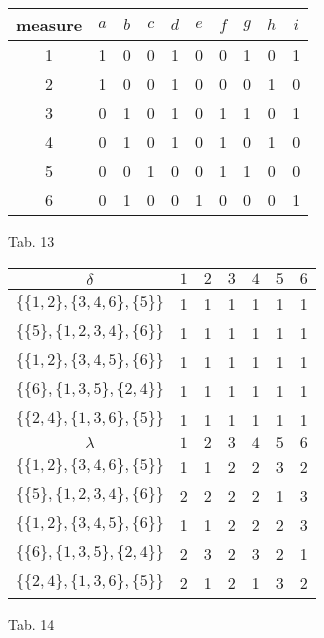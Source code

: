 \vspace{1cm}
{\rm
\begin{center}
\begin{tabular}{|c|c|c|c|c|c|c|c|c|c|}\hline%
measure & $a$ & $b$ & $c$ & $d$ & $e$ & $f$ & $g$ & $h$ & $i$ \\ \hline
1     &  1  &  0  &  0  &  1  &  0  &  0  &  1  &  0  &  1  \\
2     &  1  &  0  &  0  &  1  &  0  &  0  &  0  &  1  &  0  \\
3     &  0  &  1  &  0  &  1  &  0  &  1  &  1  &  0  &  1  \\
4     &  0  &  1  &  0  &  1  &  0  &  1  &  0  &  1  &  0  \\
5     &  0  &  0  &  1  &  0  &  0  &  1  &  1  &  0  &  0  \\
6     &  0  &  1  &  0  &  0  &  1  &  0  &  0  &  0  &  1  \\
\hline
\end{tabular}

\begin{center} Tab. 13  \end{center}
\end{center}
}

\vspace{1cm}
{\rm
\begin{center}
\begin{tabular}{|c|c|c|c|c|c|c|}\hline%
$\delta$ & $1$ & $2$ & $3$ & $4$ & $5$ & $6$ \\ \hline
$\{\{1,2\},\{3,4,6\},\{5\}\}$  &1&1&1&1&1&1\\
$\{\{5\},\{1,2,3,4\},\{6\}\}$  &1&1&1&1&1&1\\
$\{\{1,2\},\{3,4,5\},\{6\}\}$  &1&1&1&1&1&1\\
$\{\{6\},\{1,3,5\},\{2,4\}\}$  &1&1&1&1&1&1\\
$\{\{2,4\},\{1,3,6\},\{5\}\}$  &1&1&1&1&1&1\\
\hline
\hline
$\lambda$ & $1$ & $2$ & $3$ & $4$ & $5$ & $6$ \\ \hline
$\{\{1,2\},\{3,4,6\},\{5\}\}$  &1&1&2&2&3&2\\
$\{\{5\},\{1,2,3,4\},\{6\}\}$  &2&2&2&2&1&3\\
$\{\{1,2\},\{3,4,5\},\{6\}\}$  &1&1&2&2&2&3\\
$\{\{6\},\{1,3,5\},\{2,4\}\}$  &2&3&2&3&2&1\\
$\{\{2,4\},\{1,3,6\},\{5\}\}$  &2&1&2&1&3&2\\
\hline
\end{tabular}

\begin{center} Tab. 14  \end{center}
\end{center}
}

